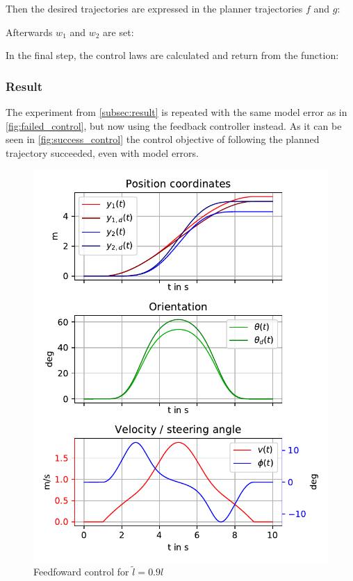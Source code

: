 \documentclass[a4paper,11pt,headings=standardclasses,parskip=half]{scrartcl}
\newcommand{\listcode}[3]{}
\newcommand{\listcodefbcontrol}[2]{\listcode{#1}{#2}{../sim/03_car_feedback_control.py}}
\begin{document}
Then the desired trajectories are expressed in the planner trajectories $f$ and $g$:
\listcodefbcontrol{103}{109}
Afterwards $w_1$ and $w_2$ are set:
\listcodefbcontrol{111}{113}
In the final step, the control laws are calculated and return from the function:
\listcodefbcontrol{115}{120}
\subsubsection{Result}
The experiment from \ref{subsec:result} is repeated with the same model error as in \autoref{fig:failed_control}, but now using the feedback controller instead. As it can be seen in \autoref{fig:success_control} the control objective of following the planned trajectory succeeded, even with model errors.
\begin{figure}[ht]
\centering
\includegraphics[scale=1]{img/failedcontrol.pdf}
\caption{Feedfoward control for $\tilde{l}=0.9l$}
\label{fig:failed_control}
\end{figure}
\end{document}
